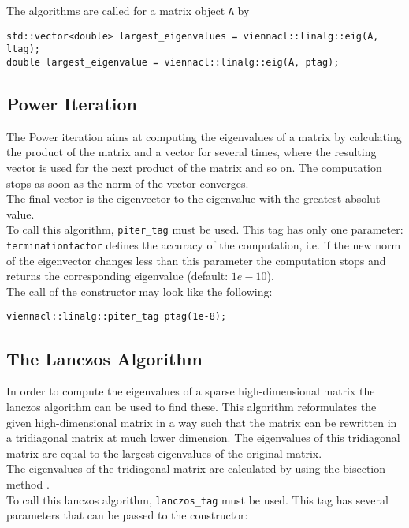 The algorithms are called for a matrix object \lstinline|A| by
\begin{lstlisting}
std::vector<double> largest_eigenvalues = viennacl::linalg::eig(A, ltag);
double largest_eigenvalue = viennacl::linalg::eig(A, ptag);
\end{lstlisting}


\subsection{Power Iteration}
The Power iteration aims at computing the eigenvalues of a matrix by calculating the product of the matrix and a vector for several times, where the resulting vector is used for the next product of the matrix and so on. The computation stops as soon as the norm of the vector converges. \\
The final vector is the eigenvector to the eigenvalue with the greatest absolut value.\\
To call this algorithm, \lstinline|piter_tag| must be used.
This tag has only one parameter: \\ \lstinline|terminationfactor| defines the accuracy of the computation, i.e. if the new norm of the eigenvector changes less than this parameter the computation stops and returns the corresponding eigenvalue (default: $1e-10$).\\
The call of the constructor may look like the following:
\begin{lstlisting} 
viennacl::linalg::piter_tag ptag(1e-8);
\end{lstlisting}


\subsection{The Lanczos Algorithm}
In order to compute the eigenvalues of a sparse high-dimensional matrix the lanczos algorithm can be used to find these. 
This algorithm reformulates the given high-dimensional matrix in a way such that the matrix can be rewritten in a tridiagonal matrix at much lower dimension. The eigenvalues of this tridiagonal matrix are equal to the largest eigenvalues of the original matrix. \\
The eigenvalues of the tridiagonal matrix are calculated by using the bisection method \cite{golub:matrix-computations}. \\
To call this lanczos algorithm, \lstinline|lanczos_tag| must be used.
This tag has several parameters that can be passed to the constructor:

